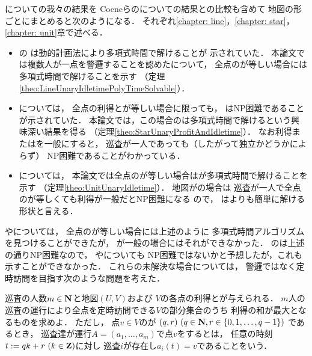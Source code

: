 {\PPProfit}についての我々の結果を
Coeneらの{\independentPP}についての結果との比較も含めて
地図の形ごとにまとめると次のようになる．
それぞれ\ref{chapter: line}，\ref{chapter: star}，\ref{chapter: unit}章で述べる．
\begin{itemize}
\item 
  {\graphLine}の
  {\independentPP}は動的計画法により多項式時間で解けることが
  示されていた\cite[Theorem~11]{coene2011charlemagne}．
  本論文では複数人が一点を警邏することを認めた{\PPProfit}について，
  全点の{\maxIdletime}が等しい場合には多項式時間で解けることを示す
  （定理\ref{theo:LineUnaryIdletimePolyTimeSolvable}）．
\item
  {\graphStar}については，
  全点の利得と{\maxIdletime}が等しい場合に限っても，
  {\independentPP}はNP困難であることが示されていた\cite[Theorem~10]{coene2011charlemagne}．
  本論文では，この場合の{\PPProfit}は多項式時間で解けるという興味深い結果を得る
  （定理\ref{theo:StarUnaryProfitAndIdletime}）．
  なお利得または{\maxIdletime}を一般にすると，
  巡査が一人であっても（したがって独立かどうかによらず）
  NP困難であることがわかっている\cite[Theorems 5 and 6]{coene2011charlemagne}．
\item 
  {\graphUnit}については，
  本論文では全点の{\maxIdletime}が等しい場合は{\PPProfit}が多項式時間で解けることを示す
  （定理\ref{theo:UnitUnaryIdletime}）．
  地図が{\graphStar}の場合は
  巡査が一人で全点の{\maxIdletime}が等しくても利得が一般だとNP困難になる
  \cite[Theorem~5]{coene2011charlemagne}ので，
  {\graphUnit}は{\graphStar}よりも簡単に解ける形状と言える．
\end{itemize}

{\graphLine}や{\graphUnit}については，
全点の{\maxIdletime}が等しい場合には上述のように
多項式時間アルゴリズムを見つけることができたが，
{\maxIdletime}が一般の場合にはそれができなかった．
{\graphStar}の{\PPProfit}は上述の通りNP困難なので\cite[Theorems 5 and 6]{coene2011charlemagne}，
{\graphLine}や{\graphUnit}についても
NP困難ではないかと予想したが，これも示すことができなかった．
これらの未解決な場合については，
警邏ではなく定時訪問を目指す次のような問題を考えた．

\begin{timeSpecifiedPatrollingProblem}
  巡査の人数$m \in \mathbf N$と地図$(U, V)$および
  $V$の各点の利得と{\exactTime}が与えられる．
  $m$人の巡査の運行により全点を定時訪問できる$V$の部分集合のうち
  利得の和が最大となるものを求めよ．
  ただし，
  点$v \in V$の{\exactTime}が
  $(q, r)\ (q \in \mathbf N, r \in \{ 0, 1, \ldots, q - 1 \})$%
  であるとき，
  巡査達が運行$A = (a _1, \ldots, a _m)$で点$v$をするとは，
  任意の時刻$t := q k + r\ (k \in \mathbf Z)$に対し
  巡査$i$が存在し$a _i (t) = v$であることをいう．
\end{timeSpecifiedPatrollingProblem}

